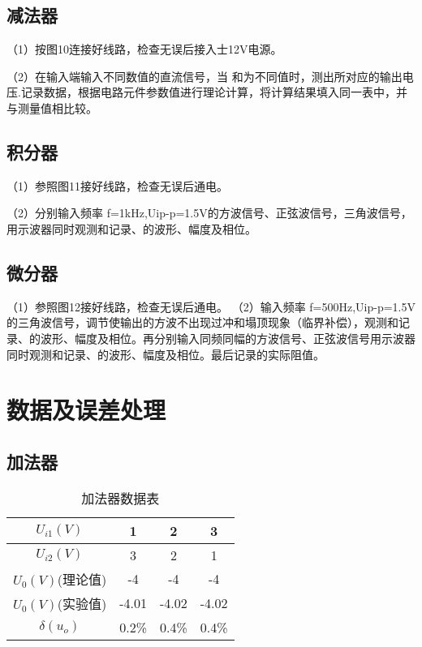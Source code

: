 \documentclass{article}
\begin{document}
  \subsection{减法器}
 （1）按图10连接好线路，检查无误后接入士12V电源。\par
 （2）在输入端输入不同数值的直流信号，当 和为不同值时，测出所对应的输出电压.记录数据，根据电路元件参数值进行理论计算，将计算结果填入同一表中，并与测量值相比较。
 \par
 \subsection{积分器}

 （1）参照图11接好线路，检查无误后通电。\par
 （2）分别输入频率 f=1kHz,Uip-p=1.5V的方波信号、正弦波信号，三角波信号，用示波器同时观测和记录、的波形、幅度及相位。
 \par
 \subsection{微分器}
 （1）参照图12接好线路，检查无误后通电。
 （2）输入频率 f=500Hz,Uip-p=1.5V的三角波信号，调节使输出的方波不出现过冲和塌顶现象（临界补偿），观测和记录、的波形、幅度及相位。再分别输入同频同幅的方波信号、正弦波信号用示波器同时观测和记录、的波形、幅度及相位。最后记录的实际阻值。




\section{ 数据及误差处理}
\subsection{加法器}
\begin{table}[h]
    \centering  
    \begin{tabular}{c|c|c|c}
        \hline
            $U_{i1}(V)$      & 1    & 2    & 3  \\ \hline
            $U_{i2}(V)$       &   3        & 2        &1        \\ \hline
            $U_{0}(V)$(理论值)  &   -4        &-4         &-4      \\ \hline
            $U_{0}(V)$(实验值) &-4.01&-4.02&-4.02  \\ \hline
            $ \delta(u_o) $ &0.2\%&0.4\%&0.4\% \\ \hline
    \end{tabular}
  
    \caption{加法器数据表}\label{SIGN}
    \end{table}
\end{document}
